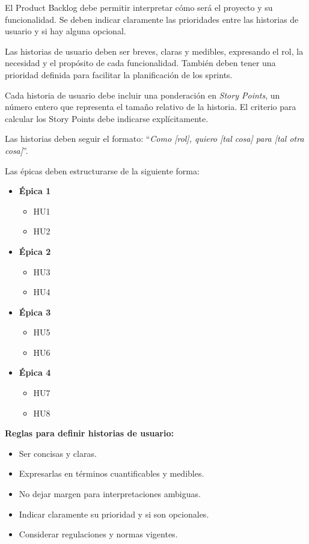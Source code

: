 \documentclass[
11pt, %
]{charter}
\begin{document}
El Product Backlog debe permitir interpretar cómo será el proyecto y su funcionalidad. Se deben indicar claramente las prioridades entre las historias de usuario y si hay alguna opcional.

Las historias de usuario deben ser breves, claras y medibles, expresando el rol, la necesidad y el propósito de cada funcionalidad. También deben tener una prioridad definida para facilitar la planificación de los sprints.

Cada historia de usuario debe incluir una ponderación en \textit{Story Points}, un número entero que representa el tama\~no relativo de la historia. El criterio para calcular los Story Points debe indicarse explícitamente.

Las historias deben seguir el formato: ``\textit{Como [rol], quiero [tal cosa] para [tal otra cosa]}''.

Las \'{e}picas deben estructurarse de la siguiente forma:

\begin{itemize}
  \item \textbf{\'{E}pica 1}
    \begin{itemize}
      \item HU1
      \item HU2
    \end{itemize}
  \item \textbf{\'{E}pica 2}
    \begin{itemize}
      \item HU3
      \item HU4
    \end{itemize}
  \item \textbf{\'{E}pica 3}
    \begin{itemize}
      \item HU5
      \item HU6
    \end{itemize}
  \item \textbf{\'{E}pica 4}
    \begin{itemize}
      \item HU7
      \item HU8
    \end{itemize}
\end{itemize}

\textbf{Reglas para definir historias de usuario:}
\begin{itemize}
  \item Ser concisas y claras.
  \item Expresarlas en términos cuantificables y medibles.
  \item No dejar margen para interpretaciones ambiguas.
  \item Indicar claramente su prioridad y si son opcionales.
  \item Considerar regulaciones y normas vigentes.
\end{itemize}
\end{document}
